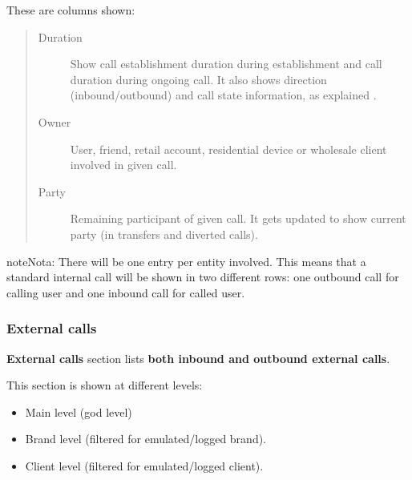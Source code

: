 \documentclass[letterpaper,10pt,spanish]{sphinxmanual}
\begin{document}
These are columns shown:
\begin{quote}
\begin{description}
\item[{Duration}] \leavevmode
Show call establishment duration during establishment and call duration during ongoing call. It also shows
direction (inbound/outbound) and call state information, as explained {\hyperref[administration_portal/platform/active_calls:call\string-state]{}}.

\item[{Owner}] \leavevmode
User, friend, retail account, residential device or wholesale client involved in given call.

\item[{Party}] \leavevmode
Remaining participant of given call. It gets updated to show current party (in transfers and diverted calls).

\end{description}
\end{quote}

\begin{notice}{note}{Nota:}
There will be one entry per entity involved. This means that a standard internal call will be shown
in two different rows: one outbound call for calling user and one inbound call for called user.
\end{notice}


\subsubsection{External calls}
\label{administration_portal/client/wholesale/calls/external_calls::doc}\label{administration_portal/client/wholesale/calls/external_calls:external-calls}
\textbf{External calls} section lists \textbf{both inbound and outbound external calls}.

This section is shown at different levels:
\begin{itemize}
\item {} 
Main level (god level)

\item {} 
Brand level (filtered for emulated/logged brand).

\item {} 
Client level (filtered for emulated/logged client).

\end{itemize}
\end{document}
